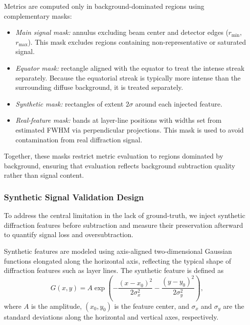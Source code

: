 \documentclass[iucr]{iucrjournals}
\begin{document}
Metrics are computed only in background-dominated regions using complementary masks:
\begin{itemize}
\item \textit{Main signal mask:} annulus excluding beam center and detector edges ($r_{\mathrm{min}}$, $r_{\mathrm{max}}$). This mask excludes regions containing non-representative or saturated signal.
\item \textit{Equator mask:} rectangle aligned with the equator to treat the intense streak separately. Because the equatorial streak is typically more intense than the surrounding diffuse background, it is treated separately.
\item \textit{Synthetic mask:} rectangles of extent $2\sigma$ around each injected feature.
\item \textit{Real-feature mask:} bands at layer-line positions with widths set from estimated FWHM via perpendicular projections. This mask is used to avoid contamination from real diffraction signal.
\end{itemize}

Together, these masks restrict metric evaluation to regions dominated by background, ensuring that evaluation reflects background subtraction quality rather than signal content.


\subsubsection{Synthetic Signal Validation Design}


To address the central limitation in the lack of ground-truth, we inject synthetic diffraction features before subtraction and measure their preservation afterward to quantify signal loss and oversubtraction.


Synthetic features are modeled using axis-aligned two-dimensional Gaussian functions elongated along the horizontal axis, reflecting the typical shape of diffraction features such as layer lines. The synthetic feature is defined as
\begin{equation}
G(x, y) = A \exp\!\left(
-\frac{(x-x_0)^2}{2\sigma_x^2}
-\frac{(y-y_0)^2}{2\sigma_y^2}
\right),
\end{equation}
where $A$ is the amplitude, $(x_0, y_0)$ is the feature center, and $\sigma_x$ and $\sigma_y$ are the standard deviations along the horizontal and vertical axes, respectively.
\end{document}
